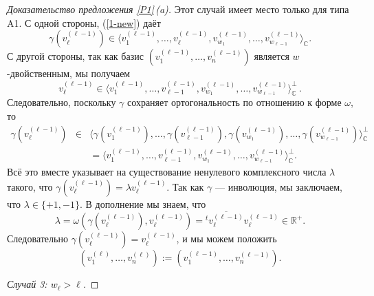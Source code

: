 \documentclass{amsart}
\theoremstyle{definition}
\begin{document}
\begin{proof}[Доказательство предложения \ref{P1}\,{\rm (a)}]
Этот случай имеет место только для типа A1.
С одной стороны, (\ref{1-new}) даёт
\[\gamma(v_\ell^{(\ell-1)})\in\langle v_1^{(\ell-1)},\ldots,v_\ell^{(\ell-1)},v_{w_1}^{(\ell-1)},\ldots,v_{w_{\ell-1}}^{(\ell-1)}\rangle_\mathbb{C}.\]
С другой стороны, так как базис $(v_1^{(\ell-1)},\ldots,v_n^{(\ell-1)})$ является $w$-двойственным,
мы получаем
\[v_\ell^{(\ell-1)}\in\langle v_1^{(\ell-1)},\ldots,v_{\ell-1}^{(\ell-1)},v_{w_1}^{(\ell-1)},\ldots,v_{w_{\ell-1}}^{(\ell-1)}\rangle_\mathbb{C}^\perp\,.\]
Следовательно, поскольку $\gamma$ сохраняет ортогональность по отношению к форме $\omega$, то
\begin{eqnarray*}
\gamma(v_\ell^{(\ell-1)}) & \in & \langle \gamma(v_1^{(\ell-1)}),\ldots,\gamma(v_{\ell-1}^{(\ell-1)}),\gamma(v_{w_1}^{(\ell-1)}),\ldots,\gamma(v_{w_{\ell-1}}^{(\ell-1)})\rangle_\mathbb{C}^\perp \\
 & & =\langle v_1^{(\ell-1)},\ldots,v_{\ell-1}^{(\ell-1)},v_{w_1}^{(\ell-1)},\ldots,v_{w_{\ell-1}}^{(\ell-1)}\rangle_\mathbb{C}^\perp.
\end{eqnarray*}
Всё это вместе  указывает на существование ненулевого комплексного  числа  $\lambda$ такого, что $\gamma(v_\ell^{(\ell-1)})=\lambda v_\ell^{(\ell-1)}$.
Так как $\gamma$ --- инволюция, мы заключаем, что $\lambda\in\{+1,-1\}$.
В дополнение мы знаем, что
\[\lambda=\omega(\gamma(v_\ell^{(\ell-1)}),v_\ell^{(\ell-1)})={}^t\overline{v_\ell^{(\ell-1)}} v_\ell^{(\ell-1)}\in\mathbb{R}^+.\]
Следовательно $\gamma(v_\ell^{(\ell-1)})=v_\ell^{(\ell-1)}$, и мы можем положить
$$(v_1^{(\ell)},\ldots,v_n^{(\ell)}):=(v_1^{(\ell-1)},\ldots,v_n^{(\ell-1)}).$$

\smallskip
\noindent
{\it Случай 3: $w_\ell>\ell$.}


\end{proof}
\end{document}
